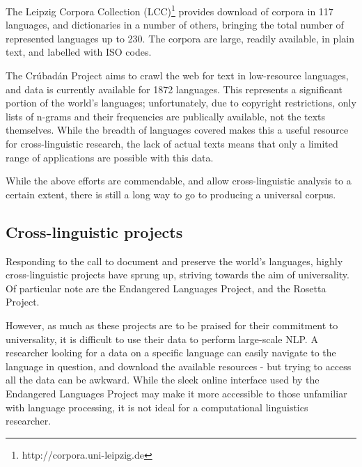 The Leipzig Corpora Collection (LCC)\footnote{http://corpora.uni-leipzig.de} \cite{biemann2007leipzig} provides download of corpora in 117 languages, and dictionaries in a number of others, bringing the total number of represented languages up to 230. The corpora are large, readily available, in plain text, and labelled with ISO codes.

The Crúbadán Project aims to crawl the web for text in low-resource languages, and data is currently available for 1872 languages.  This represents a significant portion of the world's languages; unfortunately, due to copyright restrictions, only lists of n-grams and their frequencies are publically available, not the texts themselves.  While the breadth of languages covered makes this a useful resource for cross-linguistic research, the lack of actual texts means that only a limited range of applications are possible with this data.

While the above efforts are commendable, and allow cross-linguistic analysis to a certain extent, there is still a long way to go to producing a universal corpus.

\subsection{Cross-linguistic projects}

Responding to the call to document and preserve the world's languages, highly cross-linguistic projects have sprung up, striving towards the aim of universality.  Of particular note are the Endangered Languages Project, and the Rosetta Project.

However, as much as these projects are to be praised for their commitment to universality, it is difficult to use their data to perform large-scale NLP.  A researcher looking for a data on a specific language can easily navigate to the language in question, and download the available resources - but trying to access all the data can be awkward.  While the sleek online interface used by the Endangered Languages Project may make it more accessible to those unfamiliar with language processing, it is not ideal for a computational linguistics researcher.
